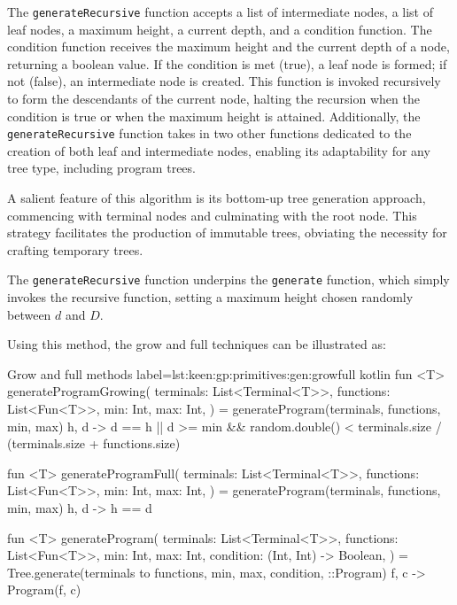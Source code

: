   The \texttt{generateRecursive} function accepts a list of intermediate nodes, 
  a list of leaf nodes, a maximum height, a current depth, and a condition 
  function. The condition function receives the maximum height and the current 
  depth of a node, returning a boolean value. If the condition is met (true), a 
  leaf node is formed; if not (false), an intermediate node is created. This 
  function is invoked recursively to form the descendants of the current node, 
  halting the recursion when the condition is true or when the maximum height is 
  attained. Additionally, the \texttt{generateRecursive} function takes in two 
  other functions dedicated to the creation of both leaf and intermediate nodes, 
  enabling its adaptability for any tree type, including program trees.

  A salient feature of this algorithm is its bottom-up tree generation approach, 
  commencing with terminal nodes and culminating with the root node. This 
  strategy facilitates the production of immutable trees, obviating the 
  necessity for crafting temporary trees.

  The \texttt{generateRecursive} function underpins the \texttt{generate} 
  function, which simply invokes the recursive function, setting a maximum 
  height chosen randomly between \(d\) and \(D\).

  Using this method, the grow and full techniques can be illustrated as:

  \begin{code}{Grow and full methods}{
    label=lst:keen:gp:primitives:gen:growfull
  }{kotlin}
    fun <T> generateProgramGrowing(
        terminals: List<Terminal<T>>,
        functions: List<Fun<T>>,
        min: Int,
        max: Int,
    ) = generateProgram(terminals, functions, min, max) { h, d ->
        d == h || d >= min 
            && random.double() < terminals.size / (terminals.size + functions.size)
    }

    fun <T> generateProgramFull(
        terminals: List<Terminal<T>>, functions: List<Fun<T>>, min: Int, max: Int,
    ) = generateProgram(terminals, functions, min, max) { h, d -> h == d }
    
    fun <T> generateProgram(
        terminals: List<Terminal<T>>,
        functions: List<Fun<T>>,
        min: Int,
        max: Int,
        condition: (Int, Int) -> Boolean,
    ) = Tree.generate(terminals to functions, min, max, condition, ::Program) { f, c ->
        Program(f, c)
    }
  \end{code}

